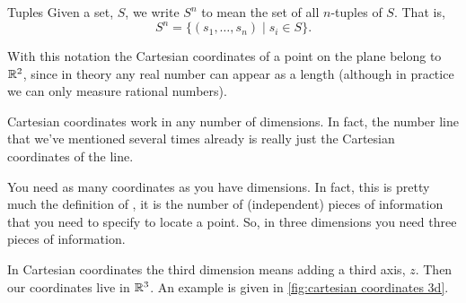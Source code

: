 \documentclass[fleqn]{LectureClass/LectureClass}
\begin{document}
    \begin{ntn}{Tuples}{}
        Given a set, \(S\), we write \(S^n\) to mean the set of all \(n\)-tuples of \(S\).
        That is,
        \begin{equation}
            S^n = \{(s_1, \dotsc, s_n) \mid s_i \in S\}.
        \end{equation}
    \end{ntn}
     
    With this notation the Cartesian coordinates of a point on the plane belong to \(\mathbb{R}^2\), since in theory any real number can appear as a length (although in practice we can only measure rational numbers).
     
    Cartesian coordinates work in any number of dimensions.
    In fact, the number line that we've mentioned several times already is really just the Cartesian coordinates of the line.
     
    You need as many coordinates as you have dimensions.
    In fact, this is pretty much the definition of , it is the number of (independent) pieces of information that you need to specify to locate a point.
    So, in three dimensions you need three pieces of information.
     
    In Cartesian coordinates the third dimension means adding a third axis, \(z\).
    Then our coordinates live in \(\mathbb{R}^3\).
    An example is given in \cref{fig:cartesian coordinates 3d}.
     
\end{document}
